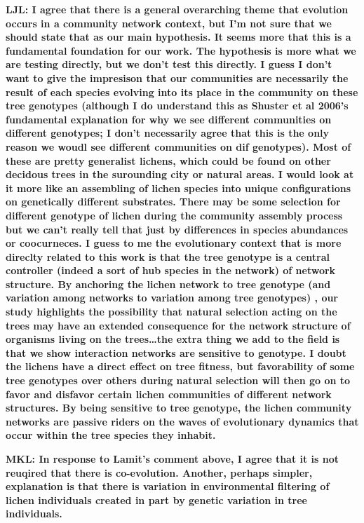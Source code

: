 \documentclass[9pt,twocolumn,twoside,lineno]{pnas-new}
\begin{document}
\textbf{LJL: I agree that there is a general overarching theme that
  evolution occurs in a community network context, but I’m not sure
  that we should state that as our main hypothesis. It seems more that
  this is a fundamental foundation for our work. The hypothesis is
  more what we are testing directly, but we don’t test this
  directly. I guess I don’t want to give the impresison that our
  communities are necessarily the result of each species evolving into
  its place in the community on these tree genotypes (although I do
  understand this as Shuster et al 2006’s fundamental explanation for
  why we see different communities on different genotypes; I don’t
  necessarily agree that this is the only reason we woudl see
  different communities on dif genotypes). Most of these are pretty
  generalist lichens, which could be found on other decidous trees in
  the surounding city or natural areas. I would look at it more like
  an assembling of lichen species into unique configurations on
  genetically different substrates. There may be some selection for
  different genotype of lichen during the community assembly process
  but we can’t really tell that just by differences in species
  abundances or coocurneces. I guess to me the evolutionary context
  that is more direclty related to this work is that the tree genotype
  is a central controller (indeed a sort of hub species in the
  network) of network structure. By anchoring the lichen network to
  tree genotype (and variation among networks to variation among tree
  genotypes) , our study highlights the possibility that natural
  selection acting on the trees may have an extended consequence for
  the network structure of organisms living on the trees…the extra
  thing we add to the field is that we show interaction networks are
  sensitive to genotype. I doubt the lichens have a direct effect on
  tree fitness, but favorability of some tree genotypes over others
  during natural selection will then go on to favor and disfavor
  certain lichen communities of different network structures. By being
  sensitive to tree genotype, the lichen community networks are
  passive riders on the waves of evolutionary dynamics that occur
  within the tree species they inhabit.}

\textbf{MKL: In response to Lamit's comment above, I agree that it is
  not reuqired that there is co-evolution. Another, perhaps simpler,
  explanation is that there is variation in environmental filtering of
  lichen individuals created in part by genetic variation in tree
  individuals.}
\end{document}
